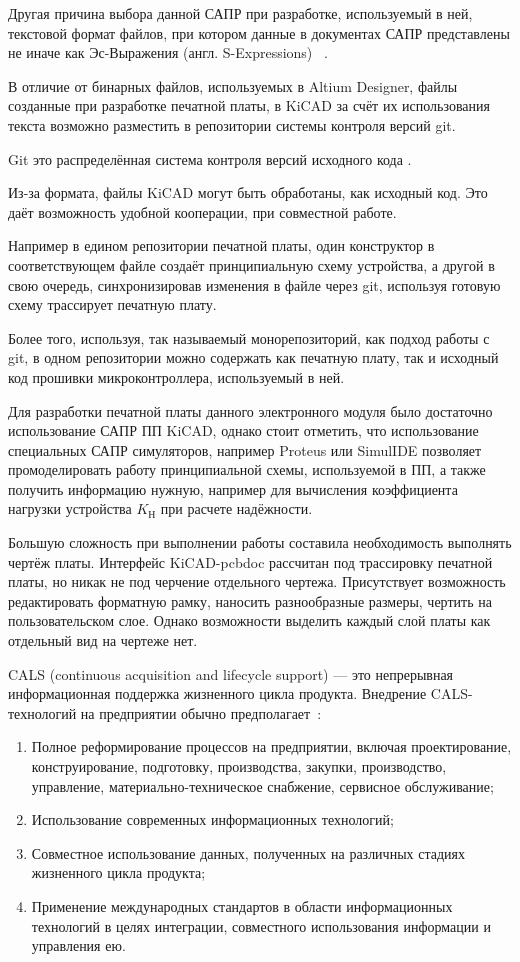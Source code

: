 Другая причина выбора данной САПР при разработке,
используемый в ней, текстовой формат файлов,
при котором данные в документах САПР представлены
не иначе как Эс-Выражения (англ. S-Expressions)
~\cite{kicad-sexpr}.

В отличие от бинарных файлов,
используемых в Altium Designer,
файлы созданные при разработке печатной платы,
в KiCAD за счёт их использования текста
возможно разместить в репозитории системы контроля версий
git.

Git это распределённая система контроля версий 
исходного кода \cite{git-dvcs}.

Из-за формата, файлы KiCAD могут быть обработаны, как
исходный код.
Это даёт возможность удобной кооперации, при совместной работе.

Например в едином репозитории печатной платы, один конструктор в
соответствующем файле создаёт принципиальную схему устройства, а
другой в свою очередь, синхронизировав изменения в файле через
git, используя готовую схему трассирует печатную плату.

Более того, используя, так называемый монорепозиторий, как подход
работы с git, в одном репозитории можно содержать как
печатную плату, так и исходный код прошивки микроконтроллера,
используемый в ней.

Для разработки печатной платы данного электронного модуля было
достаточно использование САПР ПП KiCAD, однако стоит отметить, что
использование специальных САПР симуляторов, например Proteus или
SimulIDE позволяет промоделировать работу принципиальной схемы,
используемой в ПП, а также получить информацию нужную, например для
вычисления коэффициента нагрузки устройства $K_{\textrm{Н}}$ при
расчете надёжности.

Большую сложность при выполнении работы составила необходимость
выполнять чертёж платы.
Интерфейс KiCAD-pcbdoc рассчитан под трассировку печатной
платы, но никак не под черчение отдельного чертежа.  Присутствует
возможность редактировать форматную рамку, наносить разнообразные
размеры, чертить на пользовательском слое.
Однако возможности выделить каждый слой платы как отдельный вид на
чертеже нет.

CALS (continuous acquisition and lifecycle support)  — это
непрерывная информационная поддержка жизненного цикла продукта.
Внедрение CALS-технологий на предприятии обычно
предполагает~\cite{Lanin2019}:
\begin{enumerate}
\item Полное реформирование процессов на предприятии, включая
проектирование, конструирование, подготовку, производства, закупки,
производство, управление, материально-техническое снабжение, сервисное
обслуживание;

\item Использование современных информационных технологий;
  
\item Совместное использование данных, полученных на различных стадиях
  жизненного цикла продукта;
  
\item Применение международных стандартов в области информационных
технологий в целях интеграции, совместного использования информации и
управления ею.
\end{enumerate}

